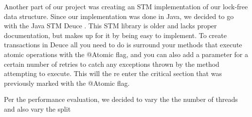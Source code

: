 \setcounter{subsection}{0}
Another part of our project was creating an STM \parencite{r5} implementation of our lock-free data structure. Since our implementation was done in Java, we decided to go with the Java STM Deuce \parencite{r6}. This STM library is older and lacks proper documentation, but makes up for it by being easy to implement. To create transactions in Deuce all you need to do is surround your methods that execute atomic operations with the @Atomic flag, and you can also add a parameter for a certain number of retries to catch any exceptions thrown by the method attempting to execute. This will the re enter the critical section that was previously marked with the @Atomic flag.

Per the performance evaluation, we decided to vary the the number of threads and also vary the split 